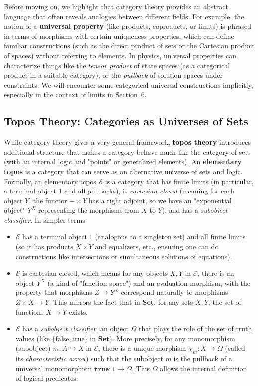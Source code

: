 \vspace{1em}
Before moving on, we highlight that category theory provides an abstract language that often reveals analogies between different fields. For example, the notion of a \textbf{universal property} (like products, coproducts, or limits) is phrased in terms of morphisms with certain uniqueness properties, which can define familiar constructions (such as the direct product of sets or the Cartesian product of spaces) without referring to elements. In physics, universal properties can characterize things like the \emph{tensor product} of state spaces (as a categorical product in a suitable category), or the \emph{pullback} of solution spaces under constraints. We will encounter some categorical universal constructions implicitly, especially in the context of limits in Section~6.

\vspace{1.5em}
\subsection{Topos Theory: Categories as Universes of Sets}

While category theory gives a very general framework, \textbf{topos theory} introduces additional structure that makes a category behave much like the category of sets (with an internal logic and "points" or generalized elements). An \textbf{elementary topos} is a category that can serve as an alternative universe of sets and logic. Formally, an elementary topos $\mathcal{E}$ is a category that has finite limits (in particular, a terminal object $1$ and all pullbacks), is \emph{cartesian closed} (meaning for each object $Y$, the functor $-\times Y$ has a right adjoint, so we have an "exponential object" $Y^X$ representing the morphisms from $X$ to $Y$), and has a \emph{subobject classifier}. In simpler terms:
\begin{itemize}
	\item $\mathcal{E}$ has a terminal object $1$ (analogous to a singleton set) and all finite limits (so it has products $X\times Y$ and equalizers, etc., ensuring one can do constructions like intersections or simultaneous solutions of equations).
	\item $\mathcal{E}$ is cartesian closed, which means for any objects $X, Y$ in $\mathcal{E}$, there is an object $Y^X$ (a kind of "function space") and an evaluation morphism, with the property that morphisms $Z \to Y^X$ correspond naturally to morphisms $Z \times X \to Y$. This mirrors the fact that in $\mathbf{Set}$, for any sets $X, Y$, the set of functions $X \to Y$ exists.
	\item $\mathcal{E}$ has a \emph{subobject classifier}, an object $\Omega$ that plays the role of the set of truth values (like $\{\text{false}, \text{true}\}$ in $\mathbf{Set}$). More precisely, for any monomorphism (subobject) $m: A \hookrightarrow X$ in $\mathcal{E}$, there is a unique morphism $\chi_m: X \to \Omega$ (called its \emph{characteristic arrow}) such that the subobject $m$ is the pullback of a universal monomorphism $\texttt{true}: 1 \to \Omega$. This $\Omega$ allows the internal definition of logical predicates.
\end{itemize}

